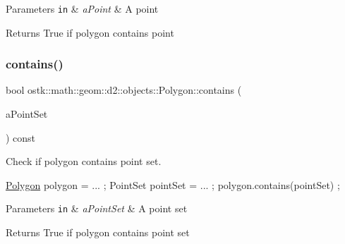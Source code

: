 \begin{DoxyParams}[1]{Parameters}
\mbox{\tt in}  & {\em a\+Point} & A point \\
\hline
\end{DoxyParams}
\begin{DoxyReturn}{Returns}
True if polygon contains point 
\end{DoxyReturn}
\mbox{\label{classostk_1_1math_1_1geom_1_1d2_1_1objects_1_1_polygon_a6a95f14d1bcbc3d0231ed09f31d17045}} 
\subsubsection{\texorpdfstring{contains()}{contains()}\hspace{0.1cm}{\footnotesize\ttfamily [2/2]}}
{\footnotesize\ttfamily bool ostk\+::math\+::geom\+::d2\+::objects\+::\+Polygon\+::contains (\begin{DoxyParamCaption}\item[{const \hyperlink{classostk_1_1math_1_1geom_1_1d2_1_1objects_1_1_point_set}{Point\+Set} \&}]{a\+Point\+Set }\end{DoxyParamCaption}) const}



Check if polygon contains point set. 


\begin{DoxyCode}
\hyperlink{classostk_1_1math_1_1geom_1_1d2_1_1objects_1_1_polygon_adaf9ef564754ab10ed3dd0d5fa0d90ea}{Polygon} polygon = ... ;
PointSet pointSet = ... ;
polygon.contains(pointSet) ;
\end{DoxyCode}



\begin{DoxyParams}[1]{Parameters}
\mbox{\tt in}  & {\em a\+Point\+Set} & A point set \\
\hline
\end{DoxyParams}
\begin{DoxyReturn}{Returns}
True if polygon contains point set 
\end{DoxyReturn}
\mbox{\label{classostk_1_1math_1_1geom_1_1d2_1_1objects_1_1_polygon_a82a1c0d6a76ee136829e0668bdd5c4a6}} 
